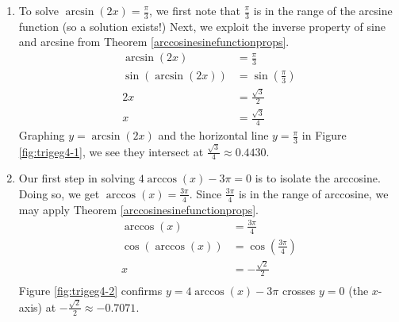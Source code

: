 {
\begin{enumerate}

\item  To solve $\arcsin(2x) = \frac{\pi}{3}$, we first note that $\frac{\pi}{3}$ is in the range of the arcsine function (so a solution exists!) Next, we exploit the inverse property of sine and arcsine from Theorem \ref{arccosinesinefunctionprops}.
\begin{align*}
\arcsin(2x) & =  \frac{\pi}{3}  \\
\sin\left(\arcsin(2x)\right) & =  \sin\left(\frac{\pi}{3}\right) \\
2x & =  \frac{\sqrt{3}}{2}  \tag*{Since $\sin(\arcsin(u)) = u$} \\
x & =  \frac{\sqrt{3}}{4}
\end{align*}
Graphing $y = \arcsin(2x)$ and the horizontal line $y = \frac{\pi}{3}$ in Figure \ref{fig:trigeg4-1}, we see they intersect at $\frac{\sqrt{3}}{4} \approx 0.4430$.


\item Our first step in solving $4\arccos(x)-3\pi = 0$ is to isolate the arccosine. Doing so, we get $\arccos(x) = \frac{3\pi}{4}$.  Since $\frac{3\pi}{4}$ is in the range of arccosine, we may apply Theorem \ref{arccosinesinefunctionprops}.
\begin{align*}
\arccos(x) & =  \frac{3\pi}{4} \\
\cos\left(\arccos(x)\right) & =  \cos\left(\frac{3\pi}{4}\right) \\
x & =  -\frac{\sqrt{2}}{2} \tag*{Since $\cos(\arccos(u)) = u$} \\ 
\end{align*}
Figure \ref{fig:trigeg4-2} confirms $y = 4\arccos(x) - 3\pi$ crosses $y = 0$ (the $x$-axis) at $-\frac{\sqrt{2}}{2} \approx -0.7071$.





\end{enumerate}}
